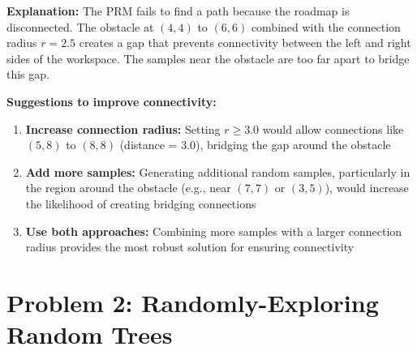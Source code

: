 \documentclass[11pt]{article}
\begin{document}
\textbf{Explanation:} The PRM fails to find a path because the roadmap is disconnected. The obstacle at $(4,4)$ to $(6,6)$ combined with the connection radius $r = 2.5$ creates a gap that prevents connectivity between the left and right sides of the workspace. The samples near the obstacle are too far apart to bridge this gap.

\textbf{Suggestions to improve connectivity:}
\begin{enumerate}
    \item \textbf{Increase connection radius:} Setting $r \geq 3.0$ would allow connections like $(5,8)$ to $(8,8)$ (distance = 3.0), bridging the gap around the obstacle
    \item \textbf{Add more samples:} Generating additional random samples, particularly in the region around the obstacle (e.g., near $(7,7)$ or $(3,5)$), would increase the likelihood of creating bridging connections
    \item \textbf{Use both approaches:} Combining more samples with a larger connection radius provides the most robust solution for ensuring connectivity
\end{enumerate}

\section{Problem 2: Randomly-Exploring Random Trees}
\end{document}
